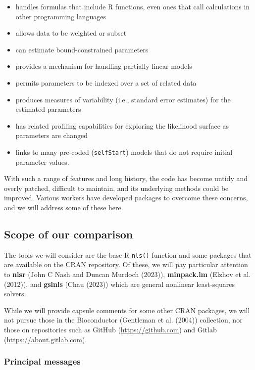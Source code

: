 \begin{itemize}
\tightlist
\item
  handles formulas that include R functions, even ones that call calculations in
  other programming languages
\item
  allows data to be weighted or subset
\item
  can estimate bound-constrained parameters
\item
  provides a mechanism for handling partially linear models
\item
  permits parameters to be indexed over a set of related data
\item
  produces measures of variability (i.e., standard error estimates) for the
  estimated parameters
\item
  has related profiling capabilities for exploring the likelihood surface as
  parameters are changed
\item
  links to many pre-coded (\texttt{selfStart}) models that do not require
  initial parameter values.
\end{itemize}

With such a range of features and long history, the code has become untidy
and overly patched, difficult to maintain, and its underlying methods could
be improved. Various workers have developed packages to overcome these
concerns, and we will address some of these here.

\hypertarget{scope-of-our-comparison}{%
\subsection{Scope of our comparison}\label{scope-of-our-comparison}}

The tools we will consider are the base-R \texttt{nls()} function
and some packages that are available on the CRAN repository.
Of these, we will pay particular attention to \textbf{nlsr} (John C Nash and Duncan Murdoch (2023)),
\textbf{minpack.lm} (Elzhov et al. (2012)), and \textbf{gslnls} (Chau (2023)) which are
general nonlinear least-squares solvers.

While we will provide capsule comments for some other CRAN packages,
we will not pursue those in the Bioconductor (Gentleman et al. (2004))
collection, nor those on repositories such as
GitHub (\url{https://github.com}) and Gitlab (\url{https://about.gitlab.com}).

\hypertarget{principal-messages}{%
\subsubsection{Principal messages}\label{principal-messages}}

